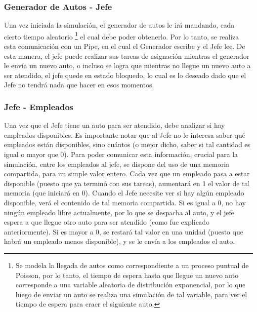 \documentclass[a4paper,12pt]{article}
\begin{document}
\subsubsection{Generador de Autos - Jefe}
Una vez iniciada la simulación, el generador de autos le irá mandando, cada cierto tiempo aleatorio \footnote{Se modela la llegada de autos como correspondiente a un proceso puntual de Poisson, por lo tanto, el tiempo de espera hasta que llegue un nuevo auto corresponde a una variable aleatoria de distribución exponencial, por lo que luego de enviar un auto se realiza una simulación de tal variable, para ver el tiempo de espera para craer el siguiente auto.}
el cual debe poder obtenerlo. Por lo tanto, se realiza esta comunicación con un Pipe, en el cual el Generador escribe y el Jefe lee. De esta manera, el jefe puede realizar sus tareas de asignación mientras el generador le envía un nuevo auto, o incluso se logra que mientras no llegue un nuevo auto a ser atendido, el jefe quede en estado bloquedo, lo cual es lo deseado dado que el Jefe no tendrá nada que hacer en esos momentos.

\subsubsection{Jefe - Empleados}
Una vez que el Jefe tiene un auto para ser atendido, debe analizar si hay empleados disponibles. Es importante notar que al Jefe no le interesa saber qué empleados están disponibles, sino cuántos (o mejor dicho, saber si tal cantidad es igual o mayor que 0). Para poder comunicar esta información, crucial para la simulación, entre los empleados al jefe, se dispone del uso de una memoria compartida, para un simple valor entero. Cada vez que un empleado pasa a estar disponible (puesto que ya terminó con sus tareas), aumentará en 1 el valor de tal memoria (que iniciará en 0). Cuando el Jefe necesite ver si hay algún empleado disponible, verá el contenido de tal memoria compartida. Si es igual a 0, no hay ningún empleado libre actualmente, por lo que se despacha al auto, y el jefe espera a que llegue otro auto para ser atendido (como fue explicado anteriormente). Si es mayor a 0, se restará tal valor en una unidad (puesto que habrá un empleado menos disponible), y se le envía a los empleados el auto. 
\end{document}
